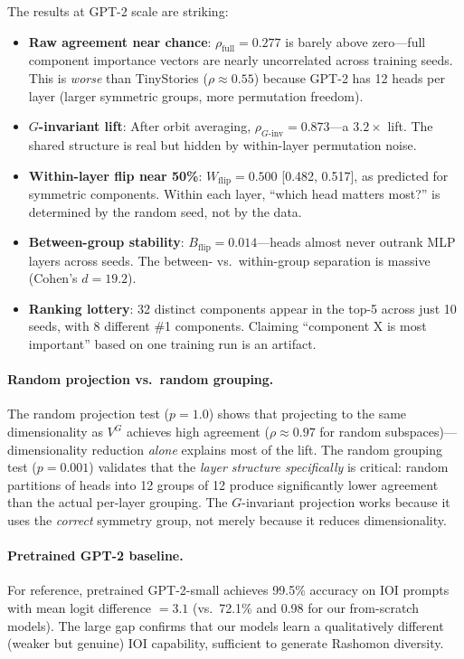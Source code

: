 \documentclass{article}
\begin{document}
The results at GPT-2 scale are striking:
\begin{itemize}
  \item \textbf{Raw agreement near chance}: $\rho_{\text{full}} = 0.277$ is barely above zero---full component importance vectors are nearly uncorrelated across training seeds. This is \emph{worse} than TinyStories ($\rho \approx 0.55$) because GPT-2 has 12 heads per layer (larger symmetric groups, more permutation freedom).
  \item \textbf{$G$-invariant lift}: After orbit averaging, $\rho_{G\text{-inv}} = 0.873$---a $3.2\times$ lift. The shared structure is real but hidden by within-layer permutation noise.
  \item \textbf{Within-layer flip near 50\%}: $W_{\text{flip}} = 0.500$ [0.482, 0.517], as predicted for symmetric components. Within each layer, ``which head matters most?'' is determined by the random seed, not by the data.
  \item \textbf{Between-group stability}: $B_{\text{flip}} = 0.014$---heads almost never outrank MLP layers across seeds. The between- vs.\ within-group separation is massive (Cohen's $d = 19.2$).
  \item \textbf{Ranking lottery}: 32 distinct components appear in the top-5 across just 10 seeds, with 8 different \#1 components. Claiming ``component X is most important'' based on one training run is an artifact.
\end{itemize}

\paragraph{Random projection vs.\ random grouping.}
The random projection test ($p = 1.0$) shows that projecting to the same dimensionality as $V^G$ achieves high agreement ($\rho \approx 0.97$ for random subspaces)---dimensionality reduction \emph{alone} explains most of the lift. The random grouping test ($p = 0.001$) validates that the \emph{layer structure specifically} is critical: random partitions of heads into 12 groups of 12 produce significantly lower agreement than the actual per-layer grouping. The $G$-invariant projection works because it uses the \emph{correct} symmetry group, not merely because it reduces dimensionality.

\paragraph{Pretrained GPT-2 baseline.}
For reference, pretrained GPT-2-small achieves 99.5\% accuracy on IOI prompts with mean logit difference $= 3.1$ (vs.\ 72.1\% and 0.98 for our from-scratch models). The large gap confirms that our models learn a qualitatively different (weaker but genuine) IOI capability, sufficient to generate Rashomon diversity.
\end{document}
